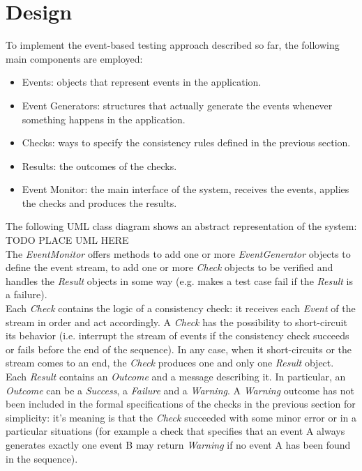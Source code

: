 \documentclass[11pt,a4paper,notitlepage]{article}
\begin{document}
\section{Design}\label{event_design}
To implement the event-based testing approach described so far, the following main components are employed:
\begin{itemize}
	\item Events: objects that represent events in the application.
	\item Event Generators: structures that actually generate the events whenever something happens in the application.
	\item Checks: ways to specify the consistency rules defined in the previous section.
	\item Results: the outcomes of the checks.
	\item Event Monitor: the main interface of the system, receives the events, applies the checks and produces the results.
\end{itemize}
The following UML class diagram shows an abstract representation of the system:\\
TODO PLACE UML HERE\\
The \textit{EventMonitor} offers methods to add one or more \textit{EventGenerator} objects to define the event stream, to add one or more \textit{Check} objects to be verified and handles the \textit{Result} objects in some way (e.g. makes a test case fail if the \textit{Result} is a failure).\medskip \\
Each \textit{Check} contains the logic of a consistency check: it receives each \textit{Event} of the stream in order and act accordingly. A \textit{Check} has the possibility to short-circuit its behavior (i.e. interrupt the stream of events if the consistency check succeeds or fails before the end of the sequence). In any case, when it short-circuits or the stream comes to an end, the \textit{Check} produces one and only one \textit{Result} object.\medskip \\
Each \textit{Result} contains an \textit{Outcome} and a message describing it. In particular, an \textit{Outcome} can be a \textit{Success}, a \textit{Failure} and a \textit{Warning}. A \textit{Warning} outcome has not been included in the formal specifications of the checks in the previous section for simplicity: it's meaning is that the \textit{Check} succeeded with some minor error or in a particular situations (for example a check that specifies that an event A always generates exactly one event B may return \textit{Warning} if no event A has been found in the sequence).\medskip \\
\end{document}
